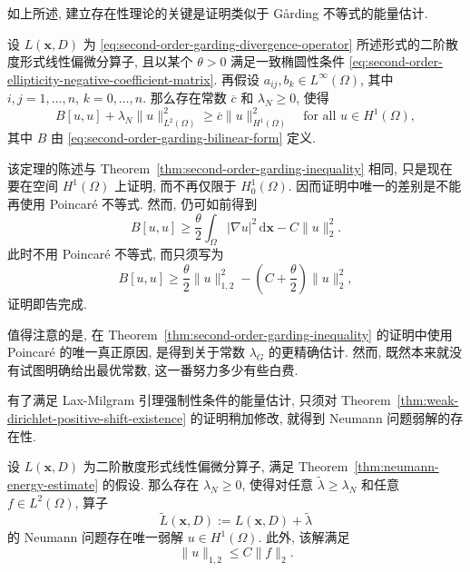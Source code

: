 如上所述, 建立存在性理论的关键是证明类似于 Gårding 不等式的能量估计.

\begin{Theorem}
\label{thm:neumann-energy-estimate}
设 $L(\bm{x},D)$ 为 \eqref{eq:second-order-garding-divergence-operator} 所述形式的二阶散度形式线性偏微分算子, 且以某个 $\theta>0$ 满足一致椭圆性条件 \eqref{eq:second-order-ellipticity-negative-coefficient-matrix}. 再假设 $a_{ij},b_k\in L^\infty(\Omega)$, 其中 $i,j=1,\ldots,n$, $k=0,\ldots,n$. 那么存在常数 $\overline c$ 和 $\lambda_N\geq0$, 使得
\begin{equation}\label{eq:neumann-energy-coercivity-inequality}
B[u,u]+\lambda_N\|u\|_{L^2(\Omega)}^2\geq\overline c\|u\|_{H^1(\Omega)}^2\quad\text{for all }u\in H^1(\Omega),
\end{equation}
其中 $B$ 由 \eqref{eq:second-order-garding-bilinear-form} 定义.
\end{Theorem}

\begin{Proof}
该定理的陈述与 Theorem~\ref{thm:second-order-garding-inequality} 相同, 只是现在要在空间 $H^1(\Omega)$ 上证明, 而不再仅限于 $H_0^1(\Omega)$. 因而证明中唯一的差别是不能再使用 Poincaré 不等式. 然而, 仍可如前得到
\begin{equation}\label{eq:neumann-energy-gradient-lower-bound}
B[u,u]\geq\dfrac{\theta}{2}\int_\Omega|\nabla u|^2\,\mathrm{d}\bm{x}-C\|u\|_2^2.
\end{equation}
此时不用 Poincaré 不等式, 而只须写为
\begin{equation}\label{eq:neumann-energy-full-h1-lower-bound}
B[u,u]\geq\dfrac{\theta}{2}\|u\|_{1,2}^2-\left(C+\dfrac{\theta}{2}\right)\|u\|_2^2,
\end{equation}
证明即告完成.
\end{Proof}

值得注意的是, 在 Theorem~\ref{thm:second-order-garding-inequality} 的证明中使用 Poincaré 的唯一真正原因, 是得到关于常数 $\lambda_G$ 的更精确估计. 然而, 既然本来就没有试图明确给出最优常数, 这一番努力多少有些白费.

有了满足 Lax-Milgram 引理强制性条件的能量估计, 只须对 Theorem~\ref{thm:weak-dirichlet-positive-shift-existence} 的证明稍加修改, 就得到 Neumann 问题弱解的存在性.

\begin{Theorem}
\label{thm:neumann-positive-shift-weak-existence}
设 $L(\bm{x},D)$ 为二阶散度形式线性偏微分算子, 满足 Theorem~\ref{thm:neumann-energy-estimate} 的假设. 那么存在 $\lambda_N\geq0$, 使得对任意 $\widetilde\lambda\geq\lambda_N$ 和任意 $f\in L^2(\Omega)$, 算子
\begin{equation}\label{eq:neumann-positive-shifted-operator}
\widetilde L(\bm{x},D):=L(\bm{x},D)+\widetilde\lambda
\end{equation}
的 Neumann 问题存在唯一弱解 $u\in H^1(\Omega)$. 此外, 该解满足
\begin{equation}\label{eq:neumann-weak-solution-l2-data-bound}
\|u\|_{1,2}\leq C\|f\|_2.
\end{equation}

\end{Theorem}
